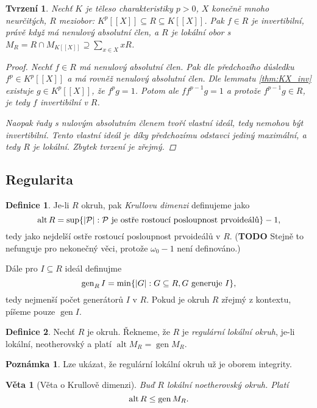 \documentclass[11pt,a4paper]{article}
\newcommand\p[1]{\mathcal{ #1 }} %
\newcommand*{\todo}[1]{\textbf{TODO} #1}
\newcommand*{\ml}[1]{\[\textstyle\let\displaystyle\textstyle#1\]}	%
\DeclareMathOperator{\alt}{alt} %
\DeclareMathOperator{\gen}{gen} %
\newcounter{numb}
\theoremstyle{definition}
\newtheorem*{definice}{Definice}
\newtheorem{poznamka}[numb]{Poznámka}		%
\theoremstyle{plain}
\newtheorem{veta}[numb]{Věta}
\newtheorem{tvrzeni}[numb]{Tvrzení}
\begin{document}
\begin{tvrzeni} \label{thm:R_loc}
	Nechť $K$ je těleso charakteristiky $p > 0$, $X$ konečně mnoho neurčitých, $R$ meziobor: $K^p[[X]] \subseteq R \subseteq K[[X]]$. Pak $f \in R$ je invertibilní, právě když má nenulový absolutní člen, a $R$ je lokální obor s $M_R = R \cap M_{K[[X]]} \supseteq \sum_{x \in X} x R$.

	\begin{proof}
		Nechť $f \in R$ má nenulový absolutní člen. Pak dle předchozího důsledku $f^p \in K^p[[X]]$ a má rovněž nenulový absolutní člen. Dle lemmatu \ref{thm:KX_inv} existuje $g \in K^p[[X]]$, že $f^p g = 1$. Potom ale $f f^{p - 1} g = 1$ a protože $f^{p - 1} g \in R$, je tedy $f$ invertibilní v $R$.

		Naopak řady s nulovým absolutním členem tvoří vlastní ideál, tedy nemohou být invertibilní. Tento vlastní ideál je díky předchozímu odstavci jediný maximální, a tedy $R$ je lokální. Zbytek tvrzení je zřejmý.
	\end{proof}
\end{tvrzeni}


\subsection{Regularita}

\begin{definice}
	Je-li $R$ okruh, pak \emph{Krullovu dimenzi} definujeme jako
	\ml{
		\alt R = \sup\{|\p P|: \p P \text{ je ostře rostoucí posloupnost prvoideálů}\} - 1,
	}
	tedy jako nejdelší ostře rostoucí posloupnost prvoideálů v $R$. (\todo{Stejně to nefunguje pro nekonečný věci, protože $\omega_0 - 1$ není definováno.})

	Dále pro $I \subseteq R$ ideál definujme
	\ml{
		\gen_R I = \min\{|G|: G \subseteq R, G \text{ generuje } I\},
	}
	tedy nejmenší počet generátorů $I$ v $R$. Pokud je okruh $R$ zřejmý z kontextu, píšeme pouze $\gen I$.
\end{definice}

\begin{definice}
	Nechť $R$ je okruh. Řekneme, že $R$ je \emph{regulární lokální okruh}, je-li lokální, neotherovský a platí $\alt M_R = \gen M_R$.
\end{definice}

\begin{poznamka}
	Lze ukázat, že regulární lokální okruh už je oborem integrity.
\end{poznamka}

\begin{veta}[Věta o Krullově dimenzi]
	Buď $R$ lokální noetherovský okruh. Platí
	\ml{
		\alt R \leq \gen M_R.
	}
\end{veta}
\end{document}
